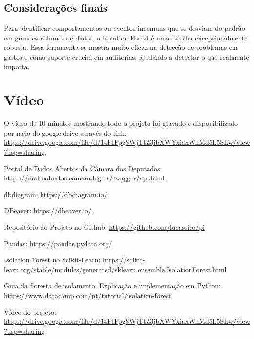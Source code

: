\documentclass[12pt, a4paper]{article}
\begin{document}
\subsection{Considerações finais}

Para identificar comportamentos ou eventos incomuns que se desviam do padrão em grandes volumes de dados, o Isolation Forest é uma escolha excepcionalmente robusta. Essa ferramenta se mostra muito eficaz na detecção de problemas em gastos e como suporte crucial em auditorias, ajudando a detectar o que realmente importa.

\section{Vídeo}
O vídeo de 10 minutos mostrando todo o projeto foi gravado e disponibilizado por meio do google drive através do link: \href{https://drive.google.com/file/d/14FIFpgSWjTtZ3jbXWYxiaxWnMd5L5SLw/view?usp=sharing}{https://drive.google.com/file/d/14FIFpgSWjTtZ3jbXWYxiaxWnMd5L5SLw/view?usp=sharing}.

\newpage
\begin{thebibliography}{9}
     Portal de Dados Abertos da Câmara dos Deputados: 
    \href{https://dadosabertos.camara.leg.br/swagger/api.html}{https://dadosabertos.camara.leg.br/swagger/api.html}

     dbdiagram: 
    \href{https://dbdiagram.io/}{https://dbdiagram.io/}
    
     DBeaver: 
    \href{https://dbeaver.io/}{https://dbeaver.io/}

     Repositório do Projeto no Github: 
    \href{https://github.com/lucassiro/pi}{https://github.com/lucassiro/pi}
    
     Pandas: 
    \href{https://pandas.pydata.org/}{https://pandas.pydata.org/}
    
     Isolation Forest no Scikit-Learn: 
    \href{https://scikit-learn.org/stable/modules/generated/sklearn.ensemble.IsolationForest.html}{https://scikit-learn.org/stable/modules/generated/sklearn.ensemble.IsolationForest.html}
    
     Guia da floresta de isolamento: Explicação e implementação em Python: 
    \href{https://www.datacamp.com/pt/tutorial/isolation-forest}{https://www.datacamp.com/pt/tutorial/isolation-forest}
    
     Vídeo do projeto: 
    \href{https://drive.google.com/file/d/14FIFpgSWjTtZ3jbXWYxiaxWnMd5L5SLw/view?usp=sharing}{https://drive.google.com/file/d/14FIFpgSWjTtZ3jbXWYxiaxWnMd5L5SLw/view?usp=sharing}
\end{thebibliography}
\end{document}
